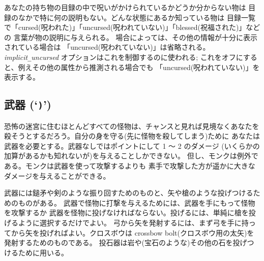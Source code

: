 あなたの持ち物の目録の中で呪いがかけられているかどうか分からない物は
目録のなかで特に何の説明もない。どんな状態にあるか知っている物は
目録一覧で「cursed(呪われた)」「uncursed(呪われていない)」「blessed(祝福された)」などの
言葉が物の説明に与えられる。
場合によっては、その他の情報が十分に表示されている場合は
「uncursed(呪われていない)」は省略される。
{\it implicit\verb+_+uncursed\/}
オプションはこれを制御するのに使われる;
これをオフにすると、例えその他の属性から推測される場合でも
「uncursed(呪われていない)」を表示する。

\subsection*{武器 (`{\tt )}')}

恐怖の迷宮に住むほとんどすべての怪物は、チャンスと見れば見境なくあなたを
殺そうとするだろう。自分の身を守る(先に怪物を殺してしまう)ために
あなたは武器を必要とする。武器なしではポイントにして 1 ～ 2 のダメージ
(いくらかの加算があるかも知れないが)を与えることしかできない。
但し、モンクは例外である。モンクは武器を使って攻撃するよりも
素手で攻撃した方が遥かに大きなダメージを与えることができる。

武器には鎚矛や剣のような振り回すためのものと、矢や槍のような投げつけるためのものがある。
武器で怪物に打撃を与えるためには、武器を手にもって怪物を攻撃するか
武器を怪物に投げなければならない。投げるには、単純に槍を投げるように選択するだけでよい。
弓から矢を発射するには、まず弓を手に持ってから矢を投げればよい。クロスボウは
crossbow bolt(クロスボウ用の太矢)を発射するためのものである。
投石器は岩や(宝石のような)その他の石を投げつけるために用いる。

